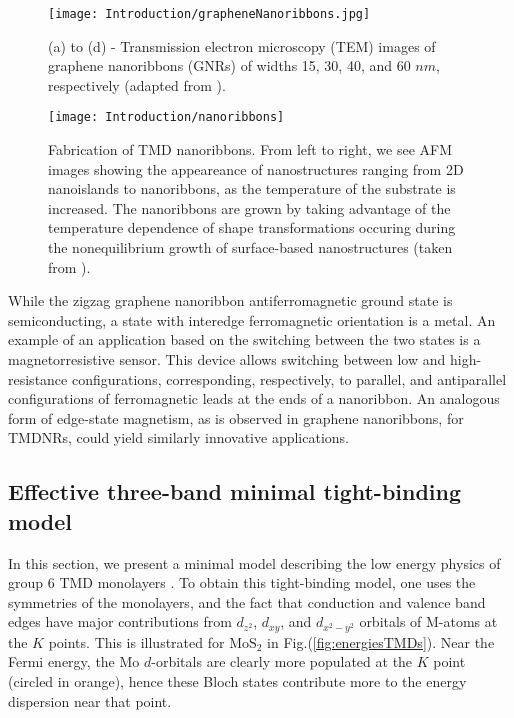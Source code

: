 \begin{figure}[H]
\vspace{-0.5cm}
\centering
\texttt{[image: Introduction/grapheneNanoribbons.jpg]}
\caption[(TEM) images of graphene nanoribbons.]{(a) to (d) - Transmission electron microscopy (TEM) images of graphene nanoribbons (GNRs) of widths 15, 30, 40, and 60 $nm$, respectively (adapted from \cite{mohanty_nanotomy-based_2012}).}
\label{fig:graphNano}
\end{figure}

\begin{figure}[H]
\centering
\texttt{[image: Introduction/nanoribbons]}
\caption[Fabrication of \ac{TMD} nanoribbons]{Fabrication of \ac{TMD} nanoribbons. From left to right, we see \ac{AFM} images showing the appeareance of nanostructures ranging from \ac{2D} nanoislands to nanoribbons, as the temperature of the substrate is increased. The nanoribbons are grown by taking advantage of the temperature dependence of shape transformations occuring during the nonequilibrium growth of surface-based nanostructures (taken from \cite{chen_fabrication_2017}).}
\label{fig:fabrication}
\end{figure}

While the zigzag graphene nanoribbon antiferromagnetic ground state is semiconducting, a state with interedge ferromagnetic orientation is a metal.
An example of an application based on the switching between the two states is a magnetorresistive sensor.
This device allows switching between low and high-resistance configurations, corresponding, respectively, to parallel, and antiparallel configurations of ferromagnetic leads at the ends of a nanoribbon.
An analogous form of edge-state magnetism, as is observed in graphene nanoribbons, for \acp{TMDNR}, could yield similarly innovative applications.

\subsection{Effective three-band minimal tight-binding model}\label{subsec:threeband}

In this section, we present a minimal model describing the low energy physics of group 6 \acs{TMD} monolayers \cite{liu_three-band_2013}.
To obtain this tight-binding model, one uses the symmetries of the monolayers, and the fact that conduction and valence band edges have major contributions from $d_{z^2}$, $d_{xy}$, and $d_{x^2 - y^2}$ orbitals of M-atoms at the $K$ points.
This is illustrated for $\text{Mo}\text{S}_2$ in Fig.(\ref{fig:energiesTMDs}).
Near the Fermi energy, the $\text{Mo}$ $d$-orbitals are clearly more populated at the $K$ point (circled in orange), hence these Bloch  states contribute more to the energy dispersion near that point.

